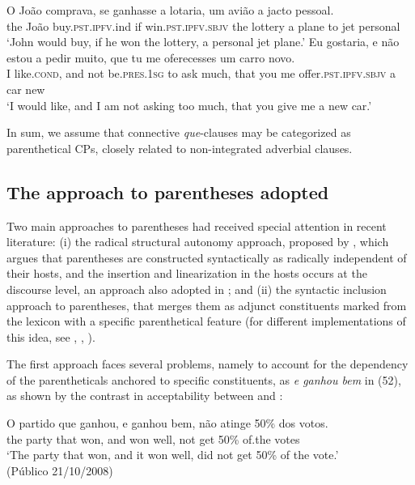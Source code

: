\documentclass[output=paper,colorlinks,citecolor=brown,
]{langscibook}
\begin{document}
\ea \label{ex:matos:lotaria}
 \ea \label{ex:matos:lotaria-a}
 \gll O  João  comprava, se  ganhasse a lotaria, um avião a jacto pessoal.\\
      the João buy.\textsc{pst}.\textsc{ipfv}.\textsc{}ind if win.\textsc{pst}.\textsc{ipfv}.\textsc{sbjv} the lottery a plane to jet personal\\
 \glt ‘John would buy, if he won the lottery, a personal jet plane.’
 \ex \label{ex:matos:carro-novo}
 \gll Eu gostaria, e não estou a pedir muito, que tu me oferecesses um      carro novo.\\
      I like.\textsc{cond}, and not be.\textsc{pres}.\textsc{1sg} to ask much, that you me offer.\textsc{pst}.\textsc{ipfv}.\textsc{sbjv} a car new\\
 \glt ‘I would like, and I am not asking too much, that you give me a new car.’
 \z
\z 

In sum, we assume that connective \textit{que}-clauses may be categorized as parenthetical CPs, closely related to non-integrated adverbial clauses.	

\subsection{The approach to parentheses adopted} \label{sec:matos:sect5-3}

Two main approaches to parentheses had received special attention in recent literature: (i) the radical structural autonomy approach, proposed by \citet{haegeman_parenthetical_1991}, which argues that parentheses are constructed syntactically as radically independent of their hosts, and the insertion and linearization in the hosts occurs at the discourse level, an approach also adopted in \citet[1351--1353]{huddleston_coordination_2002}; and (ii) the syntactic inclusion approach to parentheses, that merges them as adjunct constituents marked from the lexicon with a specific parenthetical feature (for different implementations of this idea, see \citealt{potts_lexical_2002}, \citealt{matos_appositive_2009}, \citealt{de_vries_unconventional_2012}).

The first approach faces several problems, namely to account for the dependency of the parentheticals anchored to specific constituents, as \textit{e ganhou bem} in (52), as shown by the contrast in acceptability between  and :

\ea \label{ex:matos:partido}
 \ea \label{ex:matos:partido-a}
 \gll O partido que ganhou, e ganhou bem, não atinge 50\% dos votos.\\ 
      the party that won, and won well, not get 50\% of.the votes\\
 \glt ‘The party that won, and it won well, did not get 50\% of the         vote.’\\ 
     (Público 21/10/2008)
  \label{ex:matos:partido-b}
 \z
\z 
\end{document}
